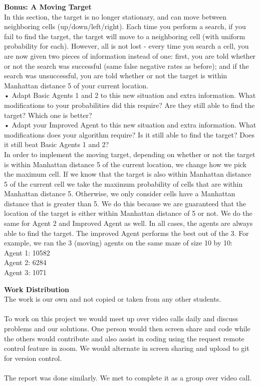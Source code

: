 \documentclass{article}
\theoremstyle{definition}
\begin{document}
\textbf{Bonus: A Moving Target} \\
In this section, the target is no longer stationary, and can move between neighboring cells (up/down/left/right). Each time you perform a search, if you fail to find the target, the target will move to a neighboring cell (with uniform probability for each). However, all is not lost - every time you search a cell, you are now given two pieces of information instead of one: first, you are told whether or not the search was successful (same false negative rates as before); and if the search was unsuccessful, you are told whether or not the target is within Manhattan distance 5 of your current location. \\
• Adapt Basic Agents 1 and 2 to this new situation and extra information. What modifications to your probabilities did this require? Are they still able to find the target? Which one is better?\\
• Adapt your Improved Agent to this new situation and extra information. What modifications does your algorithm require? Is it still able to find the target? Does it still beat Basic Agents 1 and 2? \\

In order to implement the moving target, depending on whether or not the target is within Manhattan distance 5 of the current location, we change how we pick the maximum cell. If we know that the target is also within Manhattan distance 5 of the current cell we take the maximum probability of cells that are within Manhattan distance 5. Otherwise, we only consider cells have a Manhattan distance that is greater than 5. We do this because we are guaranteed that the location of the target is either within Manhattan distance of 5 or not. We do the same for Agent 2 and Improved Agent as well. In all cases, the agents are always able to find the target. The improved Agent performs the best out of the 3. For example, we ran the 3 (moving) agents on the same maze of size 10 by 10: \\
Agent 1: 10582 \\
Agent 2: 6284 \\
Agent 3: 1071 \\

\smallskip

\textbf{Work Distribution}
\\
The work is our own and not copied or taken from any other students. 
\\\\
To work on this project we would meet up over video calls daily and discuss problems and our solutions. One person would then screen share and code while the others would contribute and also assist in coding using the request remote control feature in zoom. We would alternate in screen sharing and upload to git for version control. 
\\\\
The report was done similarly. We met to complete it as a group over video call. 
\smallskip
\end{document}
